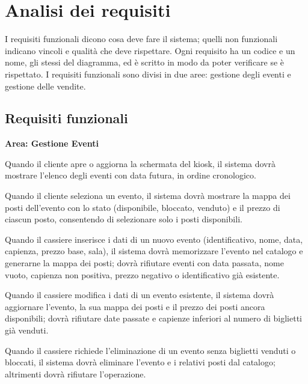 \section{Analisi dei requisiti}
\label{sec:requisiti}

I requisiti funzionali dicono cosa deve fare il sistema; quelli non funzionali indicano vincoli e qualità che deve rispettare. Ogni requisito ha un codice e un nome, gli stessi del diagramma, ed è scritto in modo da poter verificare se è rispettato. I requisiti funzionali sono divisi in due aree: gestione degli eventi e gestione delle vendite.


\subsection{Requisiti funzionali}

\textbf{Area: Gestione Eventi}

\begin{description}[style=nextline,leftmargin=0.6cm,itemsep=3pt]
\item[RF1 -- Mostra eventi futuri] Quando il cliente apre o aggiorna la schermata del kiosk, il sistema dovrà mostrare l'elenco degli eventi con data futura, in ordine cronologico.
\item[RF2 -- Mostra mappa posti] Quando il cliente seleziona un evento, il sistema dovrà mostrare la mappa dei posti dell'evento con lo stato (disponibile, bloccato, venduto) e il prezzo di ciascun posto, consentendo di selezionare solo i posti disponibili.
\item[RF10 -- Cassiere crea evento futuro] Quando il cassiere inserisce i dati di un nuovo evento (identificativo, nome, data, capienza, prezzo base, sala), il sistema dovrà memorizzare l'evento nel catalogo e generarne la mappa dei posti; dovrà rifiutare eventi con data passata, nome vuoto, capienza non positiva, prezzo negativo o identificativo già esistente.
\item[RF11 -- Cassiere aggiorna evento futuro] Quando il cassiere modifica i dati di un evento esistente, il sistema dovrà aggiornare l'evento, la sua mappa dei posti e il prezzo dei posti ancora disponibili; dovrà rifiutare date passate e capienze inferiori al numero di biglietti già venduti.
\item[RF12 -- Cassiere elimina evento futuro] Quando il cassiere richiede l'eliminazione di un evento senza biglietti venduti o bloccati, il sistema dovrà eliminare l'evento e i relativi posti dal catalogo; altrimenti dovrà rifiutare l'operazione.
\end{description}

